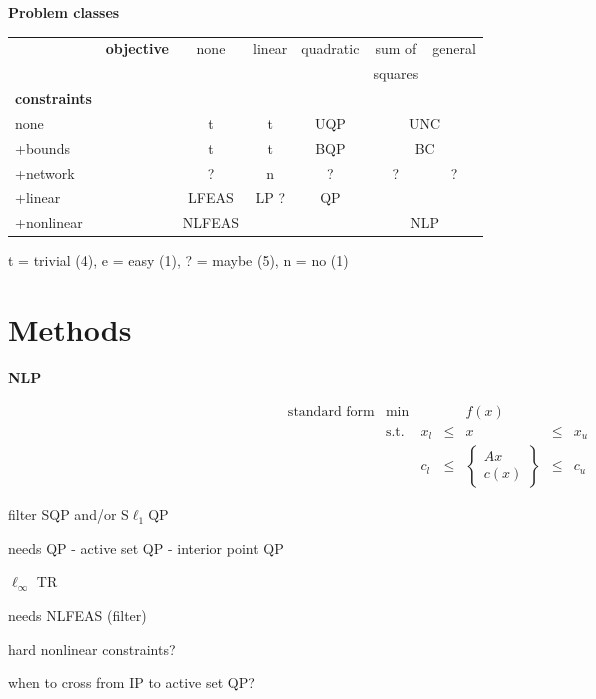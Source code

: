 \documentclass[twoside]{article}
\newcommand{\disp}[1]{\[{#1}\]}
\newcommand{\arr}[2]{\begin{array}{#1}#2\end{array}}
\newcommand{\alist}[2]{\begin{#1}{#2}\end{#1}}
\newcommand{\ilist}[1]{\alist{itemize}{#1}}
\newcommand{\header}[1]{\vspace{5mm}

\noindent
\textbf{\large {#1}}}
\begin{document}
\header{Problem classes}

\begin{center}
\begin{tabular}{|ll|c|c|c|c|c|}
\hline
           &  {\bf objective} 
              &  none  &  linear  & quadratic & sum of  & general   \\
           &  &        &          &           & squares &           \\
{\bf  constraints}  
           &  &        &          &           &         &           \\
\hline              
none       &  &   t    &   t      &    UQP    & \multicolumn{2}{c|}{UNC}\\
\hline              
+bounds    &  &   t    &   t      &    BQP    & \multicolumn{2}{c|}{BC}\\
\hline              
+network   &  &   ?    &   n      &    ?      &    ?    &    ?        \\
\hline              
+linear    &  &   LFEAS &   LP ?      &    QP      & \multicolumn{2}{c|}{}  \\
\cline{1-5}         
+nonlinear &  &   NLFEAS    & \multicolumn{2}{c}{} & \multicolumn{2}{c|}{NLP} \\
\hline
\end{tabular}
\end{center}


\begin{center}
   t = trivial (4),
   e = easy    (1),
   ? = maybe   (5),
   n = no      (1)
\end{center}

\section{Methods}

\header{NLP}

\disp{\arr{rlccccc}{
   \mbox{standard form}   & \min        &     &      &  f(x) &      &     \\
                          & \mbox{s.t.} & x_l & \leq &    x  & \leq & x_u \\
                          &             & c_l & \leq &  
                        \left\{ \begin{array}{c} Ax \\ c(x) \end{array} \right\}
                          & \leq & c_u}}

\ilist{
\item
   filter SQP and/or S$\ell_1$QP

\item
   needs QP
     - active set QP
     - interior point QP

\item
   $\ell_{\infty}$ TR

\item
   needs NLFEAS (filter)


\item
   hard nonlinear constraints?

\item
   when to cross from IP to active set QP?
}
\end{document}
